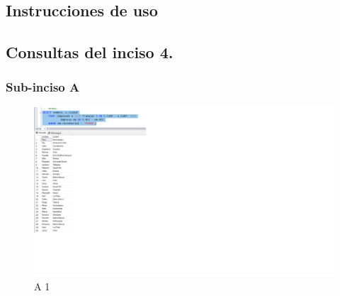 \documentclass[a4paper, 12pt]{report}
\begin{document}
\subsection*{Instrucciones de uso}
%

\subsection*{Consultas del inciso 4.}
\subsubsection*{Sub-inciso A}
\begin{figure}
    \includegraphics[width=\textwidth]
        {img/A1.png}\hfill
    \caption{A 1}
    \end{figure}
\end{document}

